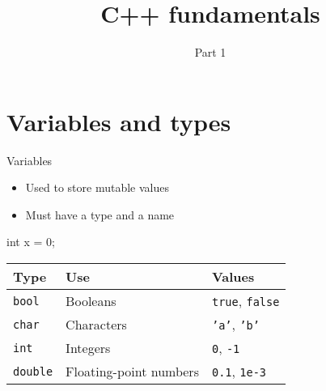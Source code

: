 

\title{C++ fundamentals}
\subtitle{Part 1}



\maketitle

\section{Variables and types}

\begin{frame}[fragile]{Variables}
    \vspace{1em}
    \begin{itemize}
        \item Used to store mutable values
        \item Must have a \alert{type} and a \alert{name}
    \end{itemize}
    \begin{cpp}
        int x = 0;
    \end{cpp}
    \begin{center}
        \begin{tabular}{lll}
            \toprule
            \textbf{Type}            & \textbf{Use}                & \textbf{Values} \\
            \midrule
            \texttt{bool}   & Booleans                    & \texttt{true}, \texttt{false} \\
            \texttt{char}   & Characters                  & \texttt{'a'}, \texttt{'b'} \\
            \texttt{int}    & Integers                    & \texttt{0}, \texttt{-1} \\
            \texttt{double} & Floating\hyp{}point numbers & \texttt{0.1}, \texttt{1e-3} \\
            \bottomrule
        \end{tabular}
    \end{center}
\end{frame}

